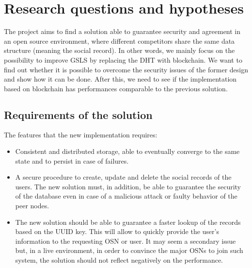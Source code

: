 \section{Research questions and hypotheses}
\label{S:3}

The project aims to find a solution able to guarantee security and agreement in an open source environment, where different competitors share the same data structure (meaning the social record). In other words, we mainly focus on the possibility to improve GSLS by replacing the DHT with blockchain. We want to find out whether it is possible to overcome the security issues of the former design and show how it can be done. After this, we need to see if the implementation based on blockchain has performances comparable to the previous solution. 

\subsection{Requirements of the solution}

The features that the new implementation requires:

\begin{itemize}
  \item Consistent and distributed storage, able to eventually converge to the same state and to persist in case of failures.
  \item A secure procedure to create, update and delete the social records of the users. The new solution must, in addition, be able to guarantee the security of the database even in case of a malicious attack or faulty behavior of the peer nodes.
  \item The new solution should be able to guarantee a faster lookup of the records based on the UUID key. This will allow to quickly provide the user's information to the requesting OSN or user. It may seem a secondary issue but, in a live environment, in order to convince the major OSNs to join such system, the solution should not reflect negatively on the performance.
\end{itemize}



